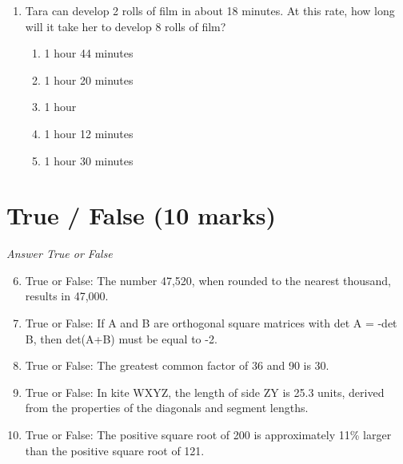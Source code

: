 \documentclass[12pt]{article}
\begin{document}
\begin{enumerate}[label=\arabic*.]
\begin{enumerate}[label=(\alph*)]
    \item The sets have identical medians.
    \item The sets have identical means.
    \item The sets have identical ranges.
    \item None of the above are false.
\end{enumerate}
\item Tara can develop 2 rolls of film in about 18 minutes. At this rate, how long will it take her to develop 8 rolls of film?
\begin{enumerate}[label=(\alph*)]
    \item 1 hour 44 minutes
    \item 1 hour 20 minutes
    \item 1 hour
    \item 1 hour 12 minutes
    \item 1 hour 30 minutes
\end{enumerate}
\end{enumerate}

\section*{True / False (10 marks)}
\textit{Answer True or False}
\begin{enumerate}[label=\arabic*.]
\setcounter{enumi}{5}
\item True or False: The number 47,520, when rounded to the nearest thousand, results in 47,000.
\item True or False: If A and B are orthogonal square matrices with det A = -det B, then det(A+B) must be equal to -2.
\item True or False: The greatest common factor of 36 and 90 is 30.
\item True or False: In kite WXYZ, the length of side ZY is 25.3 units, derived from the properties of the diagonals and segment lengths.
\item True or False: The positive square root of 200 is approximately 11\% larger than the positive square root of 121.
\end{enumerate}
\end{document}
